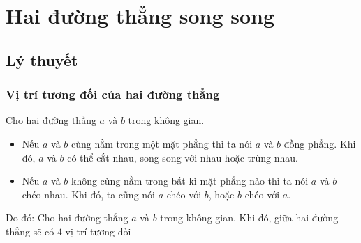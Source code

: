\section{Hai đường thẳng song song}
\subsection{Lý thuyết}
\subsubsection{Vị trí tương đối của hai đường thẳng}
\begin{dn}
	Cho hai đường thẳng $a$ và $b$ trong không gian.
	\begin{itemize}
		\item Nếu $a$ và $b$ cùng nằm trong một mặt phẳng thì ta nói $a$ và $b$ đồng phẳng. Khi đó, $a$ và $b$ có thể cắt nhau, song song với nhau hoặc trùng nhau.
		\item Nếu $a$ và $b$ không cùng nằm trong bất kì mặt phẳng nào thì ta nói $a$ và $b$ chéo nhau. Khi đó, ta cũng nói $a$ chéo với $b$, hoặc $b$ chéo với $a$.
	\end{itemize}
\end{dn}
Do đó: Cho hai đường thẳng $a$ và $b$ trong không gian. Khi đó, giữa hai đường thẳng sẽ có $4$ vị trí tương đối
